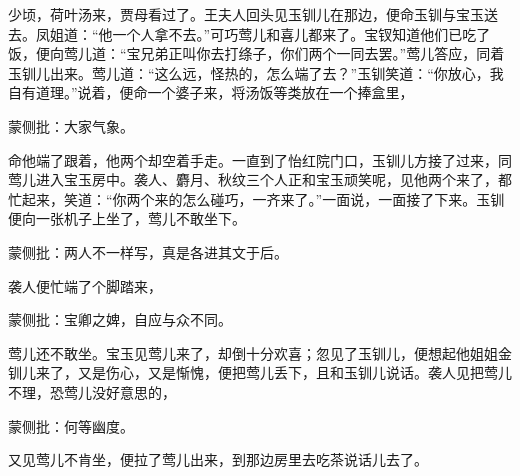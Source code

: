 \begin{parag}


    少顷，荷叶汤来，贾母看过了。王夫人回头见玉钏儿在那边，便命玉钏与宝玉送去。凤姐道：“他一个人拿不去。”可巧莺儿和喜儿都来了。宝钗知道他们已吃了饭，便向莺儿道：“宝兄弟正叫你去打绦子，你们两个一同去罢。”莺儿答应，同着玉钏儿出来。莺儿道：“这么远，怪热的，怎么端了去？”玉钏笑道：“你放心，我自有道理。”说着，便命一个婆子来，将汤饭等类放在一个捧盒里，\begin{note}蒙侧批：大家气象。\end{note}命他端了跟着，他两个却空着手走。一直到了怡红院门口，玉钏儿方接了过来，同莺儿进入宝玉房中。袭人、麝月、秋纹三个人正和宝玉顽笑呢，见他两个来了，都忙起来，笑道：“你两个来的怎么碰巧，一齐来了。”一面说，一面接了下来。玉钏便向一张机子上坐了，莺儿不敢坐下。\begin{note}蒙侧批：两人不一样写，真是各进其文于后。\end{note}袭人便忙端了个脚踏来，\begin{note}蒙侧批：宝卿之婢，自应与众不同。\end{note}莺儿还不敢坐。宝玉见莺儿来了，却倒十分欢喜；忽见了玉钏儿，便想起他姐姐金钏儿来了，又是伤心，又是惭愧，便把莺儿丢下，且和玉钏儿说话。袭人见把莺儿不理，恐莺儿没好意思的，\begin{note}蒙侧批：何等幽度。\end{note}又见莺儿不肯坐，便拉了莺儿出来，到那边房里去吃茶说话儿去了。
\end{parag}


